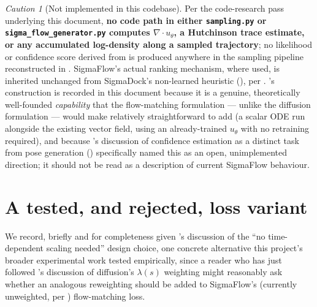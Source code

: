 \documentclass[11pt,a4paper]{report}
\theoremstyle{definition}
\theoremstyle{remark}
\newtheorem{caution}[caution]{Caution}
\newcommand{\file}[1]{\texttt{#1}}
\begin{document}
\begin{caution}[Not implemented in this codebase]
\label{caution:likelihood-not-implemented}
Per the code-research pass underlying this document, \textbf{no code path
in either \file{sampling.py} or \file{sigma\_flow\_generator.py} computes
$\nabla\cdot u_\theta$, a Hutchinson trace estimate, or any accumulated
log-density along a sampled trajectory}; no likelihood or confidence score
derived from  is produced anywhere in the
sampling pipeline reconstructed in . SigmaFlow's
actual ranking mechanism, where used, is inherited unchanged from
SigmaDock's non-learned heuristic (), per
. 's
construction is recorded in this document because it is a genuine,
theoretically well-founded \emph{capability} that the flow-matching
formulation --- unlike the diffusion formulation --- would make relatively
straightforward to add (a scalar ODE run alongside the existing vector
field, using an already-trained $u_\theta$ with no retraining required),
and because 's discussion of confidence estimation as a
distinct task from pose generation
() specifically named this as an open, unimplemented
direction; it should not be read as a description of current SigmaFlow
behaviour.
\end{caution}

\section{A tested, and rejected, loss variant}
\label{sec:variant-time-weighting}

We record, briefly and for completeness given
's discussion of the ``no time-dependent
scaling needed'' design choice, one concrete alternative this project's
broader experimental work tested empirically, since a reader who has just
followed 's discussion of diffusion's
$\lambda(s)$ weighting might reasonably ask whether an analogous
reweighting should be added to SigmaFlow's (currently unweighted, per
) flow-matching loss.
\end{document}
